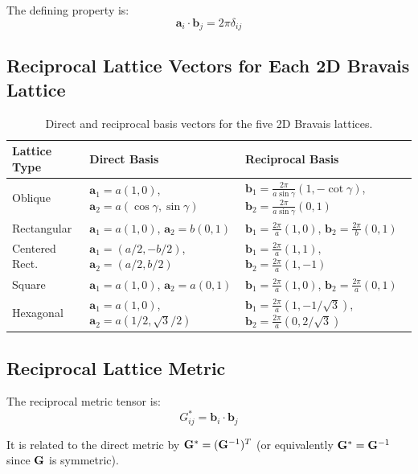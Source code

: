 The defining property is:
\begin{equation}
    \boldsymbol{a}_i \cdot \boldsymbol{b}_j = 2\pi \delta_{ij}
\end{equation}

\subsection{Reciprocal Lattice Vectors for Each 2D Bravais Lattice}

\begin{table}[h]
\centering
\begin{tabular}{lll}
\hline\hline
\textbf{Lattice Type} & \textbf{Direct Basis} & \textbf{Reciprocal Basis} \\
\hline
Oblique & $\boldsymbol{a}_1 = a(1,0)$, $\boldsymbol{a}_2 = a(\cos\gamma, \sin\gamma)$ & $\boldsymbol{b}_1 = \frac{2\pi}{a\sin\gamma}(1, -\cot\gamma)$, $\boldsymbol{b}_2 = \frac{2\pi}{a\sin\gamma}(0, 1)$ \\
Rectangular & $\boldsymbol{a}_1 = a(1,0)$, $\boldsymbol{a}_2 = b(0,1)$ & $\boldsymbol{b}_1 = \frac{2\pi}{a}(1,0)$, $\boldsymbol{b}_2 = \frac{2\pi}{b}(0,1)$ \\
Centered Rect. & $\boldsymbol{a}_1 = (a/2,-b/2)$, $\boldsymbol{a}_2 = (a/2,b/2)$ & $\boldsymbol{b}_1 = \frac{2\pi}{a}(1,1)$, $\boldsymbol{b}_2 = \frac{2\pi}{a}(1,-1)$ \\
Square & $\boldsymbol{a}_1 = a(1,0)$, $\boldsymbol{a}_2 = a(0,1)$ & $\boldsymbol{b}_1 = \frac{2\pi}{a}(1,0)$, $\boldsymbol{b}_2 = \frac{2\pi}{a}(0,1)$ \\
Hexagonal & $\boldsymbol{a}_1 = a(1,0)$, $\boldsymbol{a}_2 = a(1/2,\sqrt{3}/2)$ & $\boldsymbol{b}_1 = \frac{2\pi}{a}(1,-1/\sqrt{3})$, $\boldsymbol{b}_2 = \frac{2\pi}{a}(0,2/\sqrt{3})$ \\
\hline\hline
\end{tabular}
\caption{Direct and reciprocal basis vectors for the five 2D Bravais lattices.}
\end{table}

\subsection{Reciprocal Lattice Metric}

The reciprocal metric tensor is:
\begin{equation}
    G^*_{ij} = \boldsymbol{b}_i \cdot \boldsymbol{b}_j
\end{equation}

It is related to the direct metric by $\mathbf{G}^* = (\mathbf{G}^{-1})^T$ (or equivalently $\mathbf{G}^* = \mathbf{G}^{-1}$ since $\mathbf{G}$ is symmetric).

